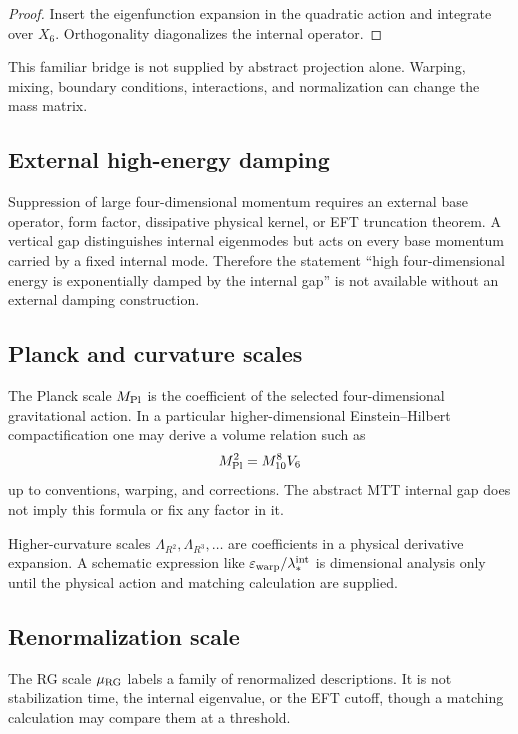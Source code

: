 \documentclass[11pt]{article}
\begin{document}
\begin{proof}
Insert the eigenfunction expansion in the quadratic action and integrate over
$X_6$. Orthogonality diagonalizes the internal operator.
\end{proof}

This familiar bridge is not supplied by abstract projection alone. Warping,
mixing, boundary conditions, interactions, and normalization can change the
mass matrix.

\subsection{External high-energy damping}

Suppression of large four-dimensional momentum requires an external base
operator, form factor, dissipative physical kernel, or EFT truncation theorem.
A vertical gap distinguishes internal eigenmodes but acts on every base
momentum carried by a fixed internal mode. Therefore the statement ``high
four-dimensional energy is exponentially damped by the internal gap'' is not
available without an external damping construction.

\subsection{Planck and curvature scales}

The Planck scale $M_{\rm Pl}$ is the coefficient of the selected
four-dimensional gravitational action. In a particular higher-dimensional
Einstein--Hilbert compactification one may derive a volume relation such as
\[
 M_{\rm Pl}^2=M_{10}^{8}V_6
\]
up to conventions, warping, and corrections. The abstract MTT internal gap
does not imply this formula or fix any factor in it.

Higher-curvature scales $\Lambda_{R^2},\Lambda_{R^3},\ldots$ are coefficients
in a physical derivative expansion. A schematic expression like
$\varepsilon_{\rm warp}/\lambda_\ast^{\rm int}$ is dimensional analysis only
until the physical action and matching calculation are supplied.

\subsection{Renormalization scale}

The RG scale $\mu_{\rm RG}$ labels a family of renormalized descriptions. It
is not stabilization time, the internal eigenvalue, or the EFT cutoff, though
a matching calculation may compare them at a threshold.
\end{document}
